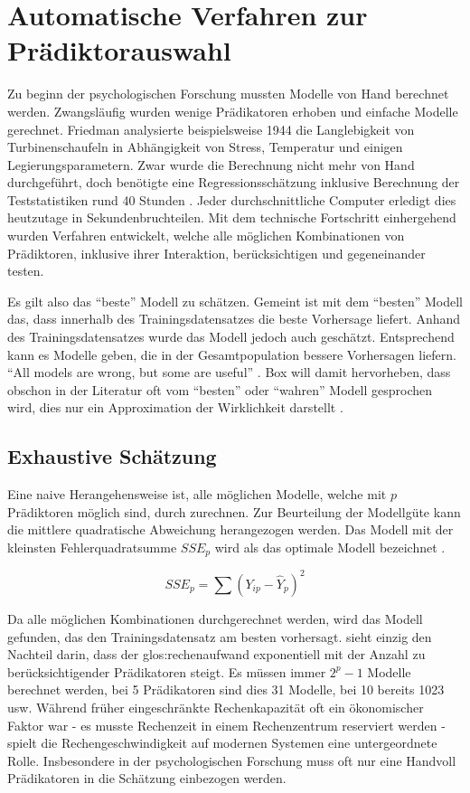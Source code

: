 \section{Automatische Verfahren zur Prädiktorauswahl}
Zu beginn der psychologischen Forschung mussten Modelle von Hand berechnet werden. Zwangsläufig wurden wenige Prädikatoren erhoben und einfache Modelle gerechnet. 
Friedman analysierte beispielsweise 1944 die Langlebigkeit von Turbinenschaufeln in Abhängigkeit von Stress, Temperatur und einigen Legierungsparametern. 
Zwar wurde die Berechnung nicht mehr von Hand durchgeführt, doch benötigte eine Regressionsschätzung inklusive Berechnung der Teststatistiken rund 40 Stunden \cite[p.2]{armstrong2011illusions}. Jeder durchschnittliche Computer erledigt dies heutzutage in Sekundenbruchteilen. 
Mit dem technische Fortschritt einhergehend wurden Verfahren entwickelt, welche alle möglichen Kombinationen von Prädiktoren, inklusive ihrer Interaktion, berücksichtigen und gegeneinander testen.

Es gilt also das ``beste'' Modell zu schätzen. 
Gemeint ist mit dem ``besten'' Modell das, dass innerhalb des Trainingsdatensatzes die beste Vorhersage liefert. 
Anhand des Trainingsdatensatzes wurde das Modell jedoch auch geschätzt. Entsprechend kann es Modelle geben, die in der Gesamtpopulation bessere Vorhersagen liefern. 
``All models are wrong, but some are useful'' \cite[p.202]{box1979robustness}.
Box will damit hervorheben, dass obschon in der Literatur oft vom ``besten'' oder ``wahren'' Modell gesprochen wird, dies nur ein Approximation der Wirklichkeit darstellt \cite[p.172]{weakliem2004introduction}.

\subsection{Exhaustive Schätzung} 
Eine naive Herangehensweise ist, alle möglichen Modelle, welche mit $p$ Prädiktoren möglich sind, durch zurechnen. 
Zur Beurteilung der Modellgüte kann die mittlere quadratische Abweichung herangezogen werden.
Das Modell mit der kleinsten Fehlerquadratsumme $SSE_p$ wird als das  optimale Modell bezeichnet \cite[p. 6]{thompson1978selection}. 

\begin{equation}
SSE_p = \sum(Y_{ip}-\hat Y_{p})^2
\tag{Fehlerquadratsumme}
\end{equation}


Da alle möglichen Kombinationen durchgerechnet werden, wird das  Modell gefunden, das den Trainingsdatensatz am besten vorhersagt.
 sieht einzig den Nachteil darin, dass der \Gls{glos:rechenaufwand} exponentiell mit der Anzahl zu berücksichtigender Prädikatoren steigt. 
Es müssen immer $2^p-1$ Modelle berechnet werden, bei 5 Prädikatoren sind dies 31 Modelle, bei 10 bereits 1023 usw.
Während früher eingeschränkte Rechenkapazität oft ein ökonomischer Faktor war - es musste Rechenzeit in einem Rechenzentrum reserviert werden - spielt die Rechengeschwindigkeit auf modernen Systemen eine untergeordnete Rolle. 
Insbesondere in der psychologischen Forschung muss oft nur eine Handvoll Prädikatoren in die Schätzung einbezogen werden.

